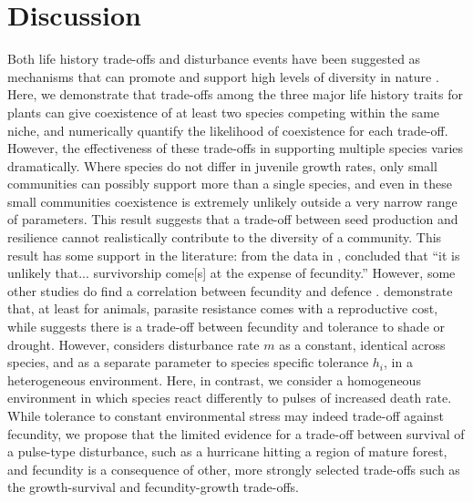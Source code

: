 \documentclass[a4paper]{article}
\begin{document}
\section{Discussion}
Both life history trade-offs and disturbance events have been suggested as mechanisms that can promote and support high levels of diversity in nature \citep[e.g.][]{adler2000space,denslow1987tropical,sousa1984role,turnbull1999seed}. Here, we demonstrate that trade-offs among the three major life history traits for plants can give coexistence of at least two species competing within the same niche, and numerically quantify the likelihood of coexistence for each trade-off. However, the effectiveness of these trade-offs in supporting multiple species varies dramatically. Where species do not differ in juvenile growth rates, only small communities can possibly support more than a single species, and even in these small communities coexistence is extremely unlikely outside a very narrow range of parameters. This result suggests that a trade-off between seed production and resilience cannot realistically contribute to the diversity of a community. This result has some support in the literature: from the data in \cite{martin2010dispersal}, \cite{martin2010divergence} concluded that ``it is unlikely that... survivorship come[s] at the expense of fecundity.'' However, some other studies do find a correlation between fecundity and defence \citep[e.g.][]{marquis1984leaf,gwynn2005resistance}. \cite{gwynn2005resistance} demonstrate that, at least for animals, parasite resistance comes with a reproductive cost, while \cite{muller2010tolerance} suggests there is a trade-off between fecundity and tolerance to shade or drought. However, \cite{muller2010tolerance} considers disturbance rate $m$ as a constant, identical across species, and as a separate parameter to species specific tolerance $h_i$, in a heterogeneous environment. Here, in contrast, we consider a homogeneous environment in which species react differently to pulses of increased death rate. While tolerance to constant environmental stress may indeed trade-off against fecundity, we propose that the limited evidence for a trade-off between survival of a pulse-type disturbance, such as a hurricane hitting a region of mature forest, and fecundity is a consequence of other, more strongly selected trade-offs such as the growth-survival and fecundity-growth trade-offs.
\end{document}
